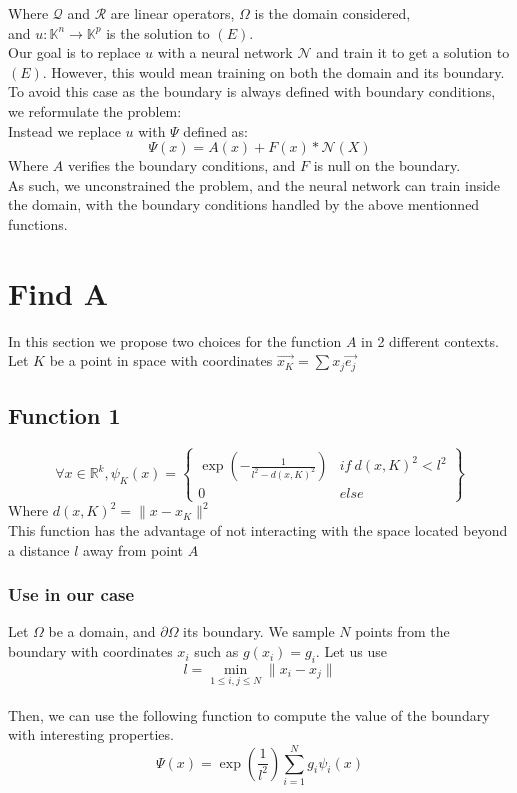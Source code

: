 \documentclass{article}
\theoremstyle{definition}
\theoremstyle{property}
\theoremstyle{remark}
\begin{document}
	Where $\mathcal{Q}$ and $\mathcal{R}$ are linear operators, $\Omega$ is the domain considered,\\
	and $u : \mathbb{K}^n \rightarrow \mathbb{K}^p$ is the solution to $(E)$.\\
	
	Our goal is to replace $u$ with a neural network $\mathcal{N}$ and train it to get a solution to $(E)$.
	However, this would mean training on both the domain and its boundary. To avoid this case as the boundary is always defined with boundary conditions, we reformulate the problem:\\

	Instead we replace $u$ with $\Psi$ defined as:
	$$\Psi(x) = A(x) + F(x)*\mathcal{N}(X)$$
	Where $A$ verifies the boundary conditions, and $F$ is null on the boundary.\\
	As such, we unconstrained the problem, and the neural network can train inside the domain, with the boundary conditions handled by the above mentionned functions.

	\section{Find A}
	In this section we propose two choices for the function $A$ in 2 different contexts.\\
	Let $K$ be a point in space with coordinates 
	\begin{math}
	\Vec{x_K} = \sum x_j\Vec{e_j}
	\end{math}

	\subsection{Function 1}
	\begin{equation*}
		\forall x \in \mathbb{R}^k, \psi_K(x)=
		\left\{
		\begin{matrix}
		\exp \left( -\frac{1}{l^2 - d(x,K)^2} \right) & if \ d(x,K)^2<l^2\\
		0 & else
		\end{matrix}
		\right\}
	\end{equation*}
	Where 
	\begin{math}
	d(x,K)^2 = \lVert x - x_K \rVert^2
	\end{math}
	\\
	This function has the advantage of not interacting with the space located beyond a distance $l$ away from point $A$

	\subsubsection{Use in our case}
	Let $\Omega$ be a domain, and $\partial\Omega$ its boundary. We sample $N$ points from the boundary with coordinates $x_i$ such as $g(x_i)=g_i$. Let us use 
	\[
	l = \min_{1\leq i,j \leq N}\lVert x_i - x_j \rVert
	\]
	\\
	Then, we can use the following function to compute the value of the boundary with interesting properties.
	\begin{equation*}
		\Psi(x) = \exp \left( \frac{1}{l^2} \right) \sum_{i=1}^{N}g_i\psi_i(x)
	\end{equation*}
\end{document}
